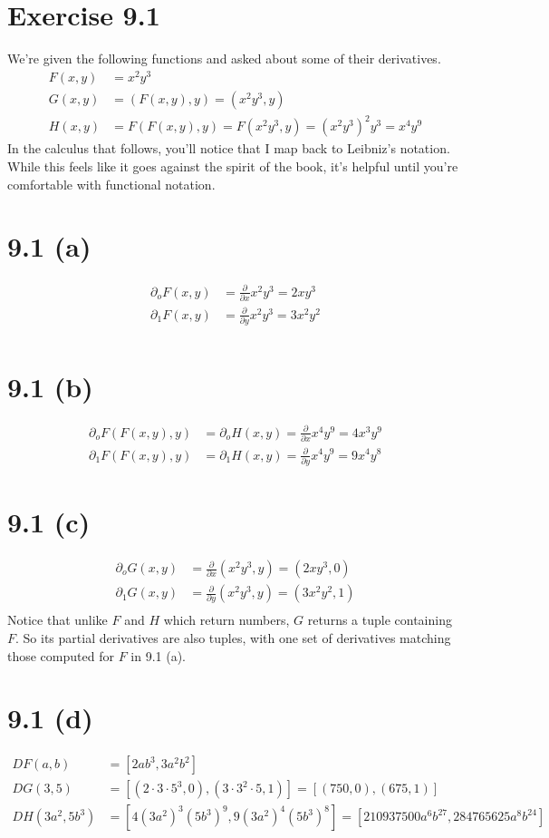 \documentclass{article}
\begin{document}
\section*{Exercise 9.1}

We're given the following functions and asked about some of their
derivatives.
\begin{align*}
  F(x, y) &= x^2 y^3 \\
  G(x, y) &= (F(x, y), y) = (x^2 y^3, y) \\
  H(x, y) &= F(F(x, y), y) = F(x^2 y^3, y) = (x^2 y^3)^2 y^3 = x^4 y^9
\end{align*}
In the calculus that follows, you'll notice that I map back to
Leibniz's notation. While this feels like it goes against the spirit
of the book, it's helpful until you're comfortable with functional
notation.

\section*{9.1 (a)}
\begin{align*}
  \partial_o F(x, y) &= \frac{\partial}{\partial x} x^2 y^3  = 2 x y^3 \\
  \partial_1 F(x, y) &= \frac{\partial}{\partial y} x^2 y^3  = 3 x^2 y^2 \\
\end{align*}

\section*{9.1 (b)}
\begin{align*}
  \partial_o F(F(x, y), y) &= \partial_o H(x, y) = \frac{\partial}{\partial x} x^4 y^9 = 4 x^3 y^9 \\
  \partial_1 F(F(x, y), y) &= \partial_1 H(x, y) = \frac{\partial}{\partial y} x^4 y^9 = 9 x^4 y^8
\end{align*}

\section*{9.1 (c)}
\begin{align*}
  \partial_o G(x, y) &= \frac{\partial}{\partial x} (x^2 y^3, y)  = (2 x y^3, 0) \\
  \partial_1 G(x, y) &= \frac{\partial}{\partial y} (x^2 y^3, y)  = (3 x^2 y^2, 1) \\
\end{align*}
Notice that unlike $F$ and $H$ which return numbers, $G$ returns a
tuple containing $F$. So its partial derivatives are also tuples, with
one set of derivatives matching those computed for $F$ in 9.1 (a).

\section*{9.1 (d)}
\begin{align*}
  DF(a, b) &= [2 a b^3, 3 a^2 b^2] \\
  DG(3, 5) &= [(2\cdot3\cdot5^3, 0), (3\cdot3^2\cdot5, 1)] = [(750, 0), (675, 1)] \\
  DH(3 a^2, 5 b^3) &= [4 (3 a^2)^3 (5 b^3)^9, 9 (3 a^2)^4 (5 b^3)^8] = [210937500 a^6 b^{27}, 284765625 a^8 b^{24}]
\end{align*}
\end{document}
